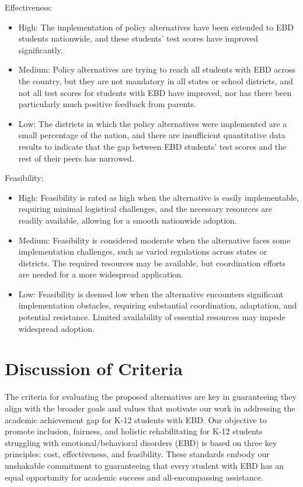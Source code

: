 \documentclass[11pt]{article}
\begin{document}
\noindent Effectiveness:
\begin{itemize}
\item High: The implementation of policy alternatives have been extended to EBD students nationwide, and these students' test scores have improved significantly.
\item Medium: Policy alternatives are trying to reach all students with EBD across the country, but they are not mandatory in all states or school districts, and not all test scores for students with EBD have improved, nor has there been particularly much positive feedback from parents.
\item Low: The districts in which the policy alternatives were implemented are a small percentage of the nation, and there are insufficient quantitative data results to indicate that the gap between EBD students' test scores and the rest of their peers has narrowed.
\end{itemize}

\noindent Feasibility:
\begin{itemize}
\item High: Feasibility is rated as high when the alternative is easily implementable, requiring minimal logistical challenges, and the necessary resources are readily available, allowing for a smooth nationwide adoption.
\item Medium: Feasibility is considered moderate when the alternative faces some implementation challenges, such as varied regulations across states or districts. The required resources may be available, but coordination efforts are needed for a more widespread application.
\item Low: Feasibility is deemed low when the alternative encounters significant implementation obstacles, requiring substantial coordination, adaptation, and potential resistance. Limited availability of essential resources may impede widespread adoption.
\end{itemize}

\section{Discussion of Criteria}

The criteria for evaluating the proposed alternatives are key in guaranteeing they align with the broader goals and values that motivate our work in addressing the academic achievement gap for K-12 students with EBD. Our objective to promote inclusion, fairness, and holistic rehabilitating for K-12 students struggling with emotional/behavioral disorders (EBD) is based on three key principles: cost, effectiveness, and feasibility. These standards embody our unshakable commitment to guaranteeing that every student with EBD has an equal opportunity for academic success and all-encompassing assistance.
\end{document}

